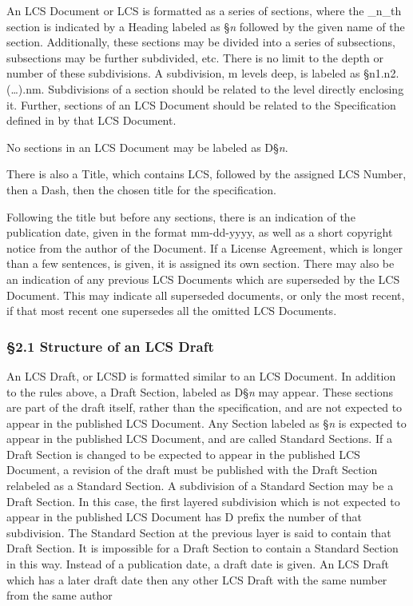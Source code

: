 An LCS Document or LCS is formatted as a series of sections, where the
\_n\_th section is indicated by a Heading labeled as §\emph{n} followed
by the given name of the section. Additionally, these sections may be
divided into a series of subsections, subsections may be further
subdivided, etc. There is no limit to the depth or number of these
subdivisions. A subdivision, m levels deep, is labeled as
§n1.n2.(\ldots).nm. Subdivisions of a section should be related to the
level directly enclosing it. Further, sections of an LCS Document should
be related to the Specification defined in by that LCS Document.

No sections in an LCS Document may be labeled as D§\emph{n}.

There is also a Title, which contains LCS, followed by the assigned LCS
Number, then a Dash, then the chosen title for the specification.

Following the title but before any sections, there is an indication of
the publication date, given in the format mm-dd-yyyy, as well as a short
copyright notice from the author of the Document. If a License
Agreement, which is longer than a few sentences, is given, it is
assigned its own section. There may also be an indication of any
previous LCS Documents which are superseded by the LCS Document. This
may indicate all superseded documents, or only the most recent, if that
most recent one supersedes all the omitted LCS Documents.

\hypertarget{structure-of-an-lcs-draft}{%
\subsubsection{§2.1 Structure of an LCS
Draft}\label{structure-of-an-lcs-draft}}

An LCS Draft, or LCSD is formatted similar to an LCS Document. In
addition to the rules above, a Draft Section, labeled as D§\emph{n} may
appear. These sections are part of the draft itself, rather than the
specification, and are not expected to appear in the published LCS
Document. Any Section labeled as §\emph{n} is expected to appear in the
published LCS Document, and are called Standard Sections. If a Draft
Section is changed to be expected to appear in the published LCS
Document, a revision of the draft must be published with the Draft
Section relabeled as a Standard Section. A subdivision of a Standard
Section may be a Draft Section. In this case, the first layered
subdivision which is not expected to appear in the published LCS
Document has D prefix the number of that subdivision. The Standard
Section at the previous layer is said to contain that Draft Section. It
is impossible for a Draft Section to contain a Standard Section in this
way. Instead of a publication date, a draft date is given. An LCS Draft
which has a later draft date then any other LCS Draft with the same
number from the same author

